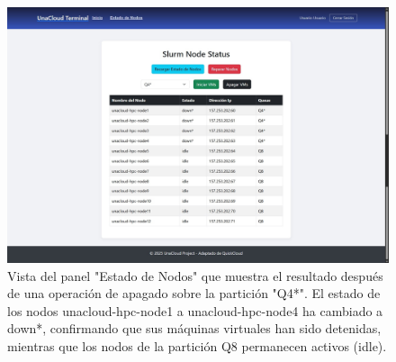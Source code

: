 \begin{figure}[H]
    \centering
    \includegraphics[width=0.75\linewidth]{Documento Final/Imagenes/NodosApagados.jpg}
    \caption{Vista del panel "Estado de Nodos" que muestra el resultado después de una operación de apagado sobre la partición "Q4*". El estado de los nodos unacloud-hpc-node1 a unacloud-hpc-node4 ha cambiado a down*, confirmando que sus máquinas virtuales han sido detenidas, mientras que los nodos de la partición Q8 permanecen activos (idle).}
    \label{fig:NodeState2}
\end{figure}


